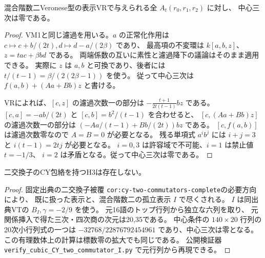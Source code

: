 \begin{proposition}
混合階数二Veronese型の表示VRで与えられる全 $A_t(r_0,r_1,r_2)$ に対し、
中心三次は零である。
\end{proposition}
\begin{proof}
VM1と同じ濾過を用いる。$a$ の正常化作用は
$c\mapsto c+b/(2t),d\mapsto d-a/(2\beta)$ であり、
最高項の不変環は $k[a,b,z]$、$z=tac+\beta bd$ である。
両端係数の互いに素性と濾過降下の議論はそのまま適用できる。
実際に $z$ は $a,b$ と可換であり、後者には
$t/(t-1)=\beta/(2(2\beta-1))$ を使う。
従って中心三次は $f(a,b)+(Aa+Bb)z$ と書ける。

VRによれば、$[c,z]$ の濾過次数一の部分は
$-\frac{t+1}{2t(t-1)}bz$ である。
$[c,a]=-ab/(2t)$ と $[c,b]=b^2/(t-1)$ を合わせると、
$[c,(Aa+Bb)z]$ の濾過次数一の部分は
$(-Aa/(t-1)+Bb/(2t))bz$ である。
$[c,f(a,b)]$ は濾過次数零なので $A=B=0$ が必要となる。
残る単項式 $a^ib^j$ には $i+j=3$ と $i(t-1)=2tj$ が必要となる。
$i=0,3$ は許容域で不可能、$i=1$ は禁止値 $t=-1/3$、
$i=2$ は矛盾となる。従って中心三次は零である。
\end{proof}

\begin{theorem}\label{thm:cubic-CY-two-commutators-empty}
二交換子のCY包絡を持つH3は存在しない。
\end{theorem}
\begin{proof}
固定出典\cite{AS4CYpinned}の二交換子被覆
\texttt{cor:cy-two-commutators-complete}の必要方向により、
既に扱った表示と、混合階数二の孤立表示 $I$ で尽くされる。
$I$ は同出典VTの $B_I,\gamma=-2/9$ を使う。
元16語のトップ行列から独立な六列を取り、
元関係挿入で得た三次・四次商の次元は20,35である。
中心条件の $140\times20$ 行列の20次小行列式の一つは
$-32768/22876792454961$ であり、中心三次は零となる。
この有理数体上の計算は標数零の拡大でも同じである。
公開検証器\\
\texttt{verify\_cubic\_CY\_two\_commutator\_I.py}
で元行列から再現できる。
\end{proof}
